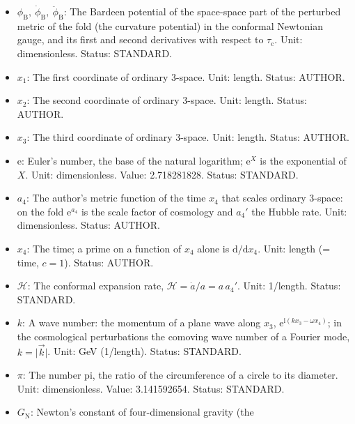 \documentclass[
  10pt,
]{article}
\begin{document}
\begin{itemize}
  \(\tau_{\mathrm{c}}\): The conformal time of the fold,
  \(\mathrm{d}\tau_{\mathrm{c}} = \mathrm{e}^{-a_4}\mathrm{d}x_4\) (the
  time divided by the scale factor \(\mathrm{e}^{a_4}\) of the fold); a
  dot on a quantity of the cosmological perturbations is
  \(\mathrm{d}/\mathrm{d}\tau_{\mathrm{c}}\). Unit: length (= time).
  Status: STANDARD.
\item
  \(\phi_{\mathrm{B}},\ \dot\phi_{\mathrm{B}},\ \ddot\phi_{\mathrm{B}}\):
  The Bardeen potential of the space-space part of the perturbed metric
  of the fold (the curvature potential) in the conformal Newtonian
  gauge, and its first and second derivatives with respect to
  \(\tau_{\mathrm{c}}\). Unit: dimensionless. Status: STANDARD.
\item
  \(x_1\): The first coordinate of ordinary 3-space. Unit: length.
  Status: AUTHOR.
\item
  \(x_2\): The second coordinate of ordinary 3-space. Unit: length.
  Status: AUTHOR.
\item
  \(x_3\): The third coordinate of ordinary 3-space. Unit: length.
  Status: AUTHOR.
\item
  \(\mathrm{e}\): Euler's number, the base of the natural logarithm;
  \(\mathrm{e}^{X}\) is the exponential of \(X\). Unit: dimensionless.
  Value: 2.718281828. Status: STANDARD.
\item
  \(a_4\): The author's metric function of the time \(x_4\) that scales
  ordinary 3-space: on the fold \(\mathrm{e}^{a_4}\) is the scale factor
  of cosmology and \(a_4'\) the Hubble rate. Unit: dimensionless.
  Status: AUTHOR.
\item
  \(x_4\): The time; a prime on a function of \(x_4\) alone is
  \(\mathrm{d}/\mathrm{d}x_4\). Unit: length (= time, \(c = 1\)).
  Status: AUTHOR.
\item
  \(\mathcal{H}\): The conformal expansion rate,
  \(\mathcal{H} = \dot a/a = a\,a_4'\). Unit: 1/length. Status:
  STANDARD.
\item
  \(k\): A wave number: the momentum of a plane wave along \(x_3\),
  \(\mathrm{e}^{\mathrm{i}(kx_3 - \omega x_4)}\); in the cosmological
  perturbations the comoving wave number of a Fourier mode,
  \(k = \lvert\vec k\rvert\). Unit: GeV (1/length). Status: STANDARD.
\item
  \(\pi\): The number pi, the ratio of the circumference of a circle to
  its diameter. Unit: dimensionless. Value: 3.141592654. Status:
  STANDARD.
\item
  \(G_{\mathrm{N}}\): Newton's constant of four-dimensional gravity (the

\end{itemize}
\end{document}
